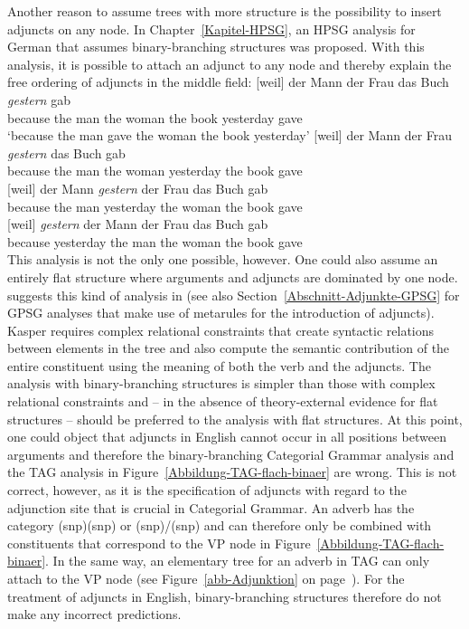 Another reason to assume trees with more structure is the possibility to insert adjuncts on any node.
In Chapter~\ref{Kapitel-HPSG}, an HPSG analysis for German that assumes binary-branching structures was proposed.
With this analysis, it is possible to attach an adjunct to any node and thereby explain the free ordering of adjuncts
in the middle field:
\eal
\ex 
\gll {}[weil] der Mann der Frau das Buch \emph{gestern} gab\\
	 {}\spacebr{}because the man the woman the book yesterday gave\\
\glt `because the man gave the woman the book yesterday'	 
\ex 
\gll {}[weil] der Mann der Frau \emph{gestern} das Buch gab\\
	 {}\spacebr{}because the man the woman yesterday the book gave\\
\ex 
\gll {}[weil] der Mann \emph{gestern} der Frau das Buch gab\\
	 {}\spacebr{}because the man yesterday the woman the book gave\\
\ex 
\gll {}[weil] \emph{gestern} der Mann der Frau das Buch gab\\
	 {}\spacebr{}because yesterday the man the woman the book gave\\
\zl
This analysis is not the only one possible, however. One could also assume an entirely flat structure where arguments
and adjuncts are dominated by one node. \citet{Kasper94a} suggests this kind of analysis in
\hpsg (see also Section~\ref{Abschnitt-Adjunkte-GPSG} for GPSG analyses that make use of metarules for the introduction of adjuncts). Kasper requires complex relational constraints that
create syntactic relations between elements in the tree and also compute the semantic contribution of the entire constituent using the meaning
of both the verb and the adjuncts. The analysis with binary-branching structures is simpler than those with complex relational constraints and --
in the absence of theory-external evidence for flat structures -- should be preferred to the analysis with flat structures.
At this point, one could object that adjuncts in English cannot occur in all positions between arguments and therefore the binary-branching
Categorial Grammar analysis and the TAG analysis in Figure~\ref{Abbildung-TAG-flach-binaer} are wrong. This is not correct, however, as it is
the specification of adjuncts with regard to the adjunction site that is crucial in Categorial Grammar.
An adverb has the category (s\bs np)\bs (s\bs np) or (s\bs np)/(s\bs np) and can therefore only be combined with constituents that correspond to the VP node in
Figure~\ref{Abbildung-TAG-flach-binaer}. In the same way, an elementary tree for an adverb in TAG
can only attach to the VP node (see Figure~\ref{abb-Adjunktion} on
page~\pageref{abb-Adjunktion}). For the treatment of adjuncts in English, binary-branching
structures therefore do not make any incorrect predictions.


